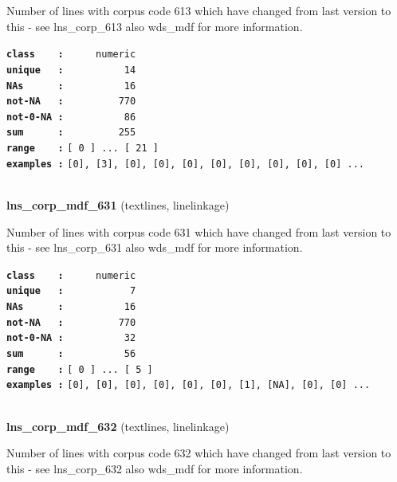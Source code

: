 \documentclass[]{article}
\begin{document}
Number of lines with corpus code 613 which have changed from last
version to this - see lns\_corp\_613 also wds\_mdf for more information.

\textbf{\texttt{class\ \ \ \ :}} \texttt{~~~~~numeric}\\
\textbf{\texttt{unique\ \ \ :}} \texttt{~~~~~~~~~~14}\\
\textbf{\texttt{NAs\ \ \ \ \ \ :}} \texttt{~~~~~~~~~~16}\\
\textbf{\texttt{not-NA\ \ \ :}} \texttt{~~~~~~~~~770}\\
\textbf{\texttt{not-0-NA\ :}} \texttt{~~~~~~~~~~86}\\
\textbf{\texttt{sum\ \ \ \ \ \ :}} \texttt{~~~~~~~~~255}\\
\textbf{\texttt{range\ \ \ \ :}}
\texttt{{[}\ 0\ {]}\ ...\ {[}\ 21\ {]}}\\
\textbf{\texttt{examples\ :}}
\texttt{{[}0{]},\ {[}3{]},\ {[}0{]},\ {[}0{]},\ {[}0{]},\ {[}0{]},\ {[}0{]},\ {[}0{]},\ {[}0{]},\ {[}0{]}\ ...}\\

~

\textbf{lns\_corp\_mdf\_631} (textlines, linelinkage)

Number of lines with corpus code 631 which have changed from last
version to this - see lns\_corp\_631 also wds\_mdf for more information.

\textbf{\texttt{class\ \ \ \ :}} \texttt{~~~~~numeric}\\
\textbf{\texttt{unique\ \ \ :}} \texttt{~~~~~~~~~~~7}\\
\textbf{\texttt{NAs\ \ \ \ \ \ :}} \texttt{~~~~~~~~~~16}\\
\textbf{\texttt{not-NA\ \ \ :}} \texttt{~~~~~~~~~770}\\
\textbf{\texttt{not-0-NA\ :}} \texttt{~~~~~~~~~~32}\\
\textbf{\texttt{sum\ \ \ \ \ \ :}} \texttt{~~~~~~~~~~56}\\
\textbf{\texttt{range\ \ \ \ :}}
\texttt{{[}\ 0\ {]}\ ...\ {[}\ 5\ {]}}\\
\textbf{\texttt{examples\ :}}
\texttt{{[}0{]},\ {[}0{]},\ {[}0{]},\ {[}0{]},\ {[}0{]},\ {[}0{]},\ {[}1{]},\ {[}NA{]},\ {[}0{]},\ {[}0{]}\ ...}\\

~

\textbf{lns\_corp\_mdf\_632} (textlines, linelinkage)

Number of lines with corpus code 632 which have changed from last
version to this - see lns\_corp\_632 also wds\_mdf for more information.
\end{document}
